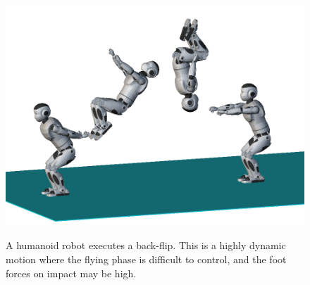 \begin{figure}
  \centering
      {\includegraphics[width = 0.8\linewidth]
        {src/chap4-conclusion/romeo-back-flip.png}}
      \caption{A humanoid robot executes a back-flip. This is a highly
        dynamic motion where the flying phase is difficult to control,
        and the foot forces on impact may be high.}
      \label{fig:chap4-romeo-back-flip}
\end{figure}
